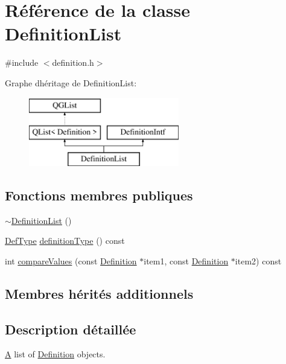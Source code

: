 \hypertarget{class_definition_list}{}\section{Référence de la classe Definition\+List}
\label{class_definition_list}


{\ttfamily \#include $<$definition.\+h$>$}

Graphe d\textquotesingle{}héritage de Definition\+List\+:\begin{figure}[H]
\begin{center}
\leavevmode
\includegraphics[height=3.000000cm]{class_definition_list}
\end{center}
\end{figure}
\subsection*{Fonctions membres publiques}
\begin{DoxyCompactItemize}
\item 
\hyperlink{class_definition_list_a3e6fe7cf2fb04b36511d70fa5fa484b1}{$\sim$\+Definition\+List} ()
\item 
\hyperlink{class_definition_intf_ada60114bc621669dd8c19edfc6421766}{Def\+Type} \hyperlink{class_definition_list_aacc8d6e59c873b75dbc5b9e222b53d20}{definition\+Type} () const 
\item 
int \hyperlink{class_definition_list_a109893cddc28f1f07b1680582c4272aa}{compare\+Values} (const \hyperlink{class_definition}{Definition} $\ast$item1, const \hyperlink{class_definition}{Definition} $\ast$item2) const 
\end{DoxyCompactItemize}
\subsection*{Membres hérités additionnels}


\subsection{Description détaillée}
\hyperlink{class_a}{A} list of \hyperlink{class_definition}{Definition} objects. 

